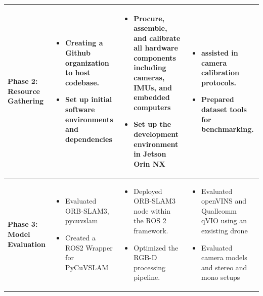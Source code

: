 \begin{table}[H]
{\begin{tabular}{|p{2cm}|p{4.3cm}|p{4.3cm}|p{4.3cm}|}
\textbf{Phase 2: Resource Gathering} &
\begin{itemize}[leftmargin=*, topsep=0pt, itemsep=0pt, parsep=0pt, partopsep=0pt]
  \item Creating a Github organization to host codebase.
  \item Set up initial software environments and dependencies
\end{itemize} &
\begin{itemize}[leftmargin=*, topsep=0pt, itemsep=0pt, parsep=0pt, partopsep=0pt]
  \item Procure, assemble, and calibrate all hardware components including cameras, IMUs, and embedded computers
  \item Set up the development environment in Jetson Orin NX
\end{itemize} &
\begin{itemize}[leftmargin=*, topsep=0pt, itemsep=0pt, parsep=0pt, partopsep=0pt]
  \item assisted in camera calibration protocols.
  \item Prepared dataset tools for benchmarking.
\end{itemize} \\
\hline

\textbf{Phase 3: Model Evaluation} &
\begin{itemize}[leftmargin=*, topsep=0pt, itemsep=0pt, parsep=0pt, partopsep=0pt]
  \item Evaluated ORB-SLAM3, pycuvslam
  \item Created a ROS2 Wrapper for PyCuVSLAM
\end{itemize} &
\begin{itemize}[leftmargin=*, topsep=0pt, itemsep=0pt, parsep=0pt, partopsep=0pt]
  \item Deployed ORB-SLAM3 node within the ROS 2 framework.
  \item Optimized the RGB-D processing pipeline.
\end{itemize} &
\begin{itemize}[leftmargin=*, topsep=0pt, itemsep=0pt, parsep=0pt, partopsep=0pt]
  \item Evaluated openVINS and Quallcomm qVIO using an exsisting drone
  \item Evaluated camera models and stereo and mono setups
\end{itemize} \\
\hline


\end{tabular}}
\end{table}
